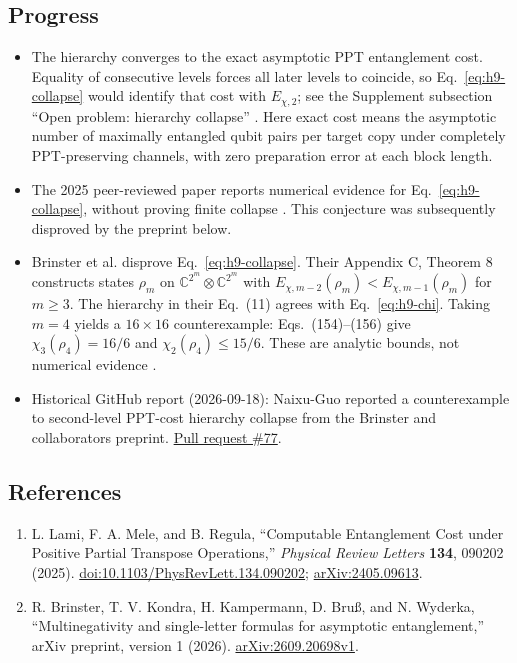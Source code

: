 \subsection*{Progress}

\begin{itemize}
  \item The hierarchy converges to the exact asymptotic PPT entanglement cost. Equality of consecutive levels forces all later levels to coincide, so Eq.~\eqref{eq:h9-collapse} would identify that cost with $E_{\chi,2}$; see the Supplement subsection ``Open problem: hierarchy collapse'' . Here exact cost means the asymptotic number of maximally entangled qubit pairs per target copy under completely PPT-preserving channels, with zero preparation error at each block length.

  \item The 2025 peer-reviewed paper reports numerical evidence for Eq.~\eqref{eq:h9-collapse}, without proving finite collapse . This conjecture was subsequently disproved by the preprint below.

  \item Brinster et al. disprove Eq.~\eqref{eq:h9-collapse}. Their Appendix C, Theorem 8 constructs states $\rho_m$ on $\mathbb C^{2^m}\otimes\mathbb C^{2^m}$ with $E_{\chi,m-2}(\rho_m)<E_{\chi,m-1}(\rho_m)$ for $m\geq3$. The hierarchy in their Eq.~(11) agrees with Eq.~\eqref{eq:h9-chi}. Taking $m=4$ yields a $16\times16$ counterexample: Eqs.~(154)--(156) give $\chi_3(\rho_4)=16/6$ and $\chi_2(\rho_4)\leq15/6$. These are analytic bounds, not numerical evidence .

  \item Historical GitHub report (2026-09-18): Naixu-Guo reported a counterexample to second-level PPT-cost hierarchy collapse from the Brinster and collaborators preprint. \href{https://github.com/Naixu-Guo/quantum-open-problems/pull/77}{Pull request \#77}.
\end{itemize}

\subsection*{References}

\begin{enumerate}[label={},leftmargin=4.8em,labelsep=0.5em]
  \footnotesize
  \item[\textup{[LMR25]}]\label{ref:h9-lami}
  L. Lami, F. A. Mele, and B. Regula, ``Computable Entanglement Cost under Positive Partial Transpose Operations,'' \emph{Physical Review Letters} \textbf{134}, 090202 (2025). \href{https://doi.org/10.1103/PhysRevLett.134.090202}{doi:10.1103/PhysRevLett.134.090202}; \href{https://arxiv.org/abs/2405.09613}{arXiv:2405.09613}.

  \item[\textup{[BKK+26]}]\label{ref:h9-brinster}
  R. Brinster, T. V. Kondra, H. Kampermann, D. Bruß, and N. Wyderka, ``Multinegativity and single-letter formulas for asymptotic entanglement,'' arXiv preprint, version 1 (2026).
  \href{https://arxiv.org/abs/2609.20698v1}{arXiv:2609.20698v1}.
\end{enumerate}

